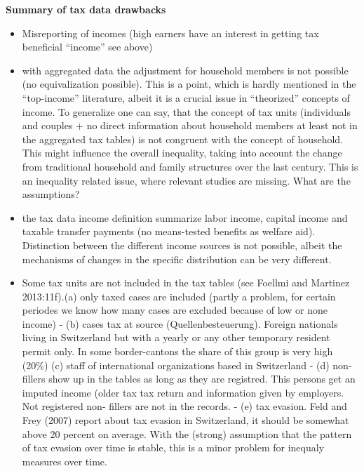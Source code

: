 \documentclass[twoside]{article}\usepackage[]{graphicx}\usepackage[]{color}
\begin{document}
\begin{multicols}{2}

\textbf{Summary of tax data drawbacks}
\begin{itemize}
\item Misreporting of incomes (high earners have an interest in getting tax beneficial “income” see above)
\item with aggregated data the adjustment for household members is not possible (no equivalization possible). This is a point, which is hardly mentioned in the “top-income” literature, albeit it is a crucial issue in “theorized” concepts of income. To generalize one can say, that the concept of tax units (individuals and couples + no direct information about household members at least not in the aggregated tax tables) is not congruent with the concept of household. This might influence the overall inequality, taking into account the change from traditional household and family structures over the last century. This is an inequality related issue, where relevant studies are missing. What are the assumptions?
\item the tax data income definition summarize labor income, capital income and taxable transfer payments (no means-tested benefits as welfare aid). Distinction between the different income sources is not possible, albeit the mechanisms of changes in the specific distribution can be very different.
\item Some tax units are not included in the tax tables (see Foellmi and Martinez 2013:11f).(a) only taxed cases are included (partly a problem, for certain periodes we know how many cases are excluded because of low or none income)	- (b) cases tax at source (Quellenbesteuerung). Foreign nationals living in Switzerland but with a yearly or any other temporary resident permit only. In some border-cantons the share of this group is very high (20\%) 
(c) staff of international organizations based in Switzerland	- (d) non-fillers show up in the tables as long as they are registred. This persons get an imputed income (older tax tax return and information given by employers. Not registered non-	fillers are not in the records.
- (e) tax evasion. Feld and Frey (2007) report about tax evasion in Switzerland, it should be somewhat above 20 percent on average. With the (strong) assumption that the pattern of tax evasion over time is stable, this is a minor problem for inequaly measures over time.
\end{itemize}


\end{multicols}
\end{document}
